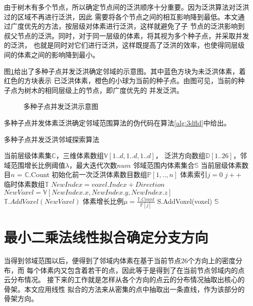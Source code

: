 由于树木有多个节点，所以确定节点间的泛洪顺序十分重要。因为泛洪算法对泛洪过的区域不再进行泛洪，因此
需要将各个节点之间的相互影响降到最低。本文通过广度优先的方法，按层级对体素进行泛洪，这样就避免了子
节点的泛洪影响到叔父节点的泛洪。同时，对于同一层级的体素，将其视为多个种子点，并采取并发的泛洪，
也就是同时对它们进行泛洪，这样既提高了泛洪的效率，也使得同层级间的体素之间的影响降到最小。

图\ref{fig:flood}给出了多种子点并发泛洪确定邻域的示意图。其中蓝色方块为未泛洪体素，着红色的方块表示
已泛洪体素，橙色的小球为当前的种子点。由图可见，当前的种子点为树木的相同层级上的节点，即广度优先的
并发泛洪。

\begin{figure}[H]
	\centering
	\hfill
	\hfill
	\hfill
	\hfill
	\caption{多种子点并发泛洪示意图}
	\label{fig:flood}
\end{figure}

多种子点并发体素泛洪确定邻域范围算法的伪代码在算法\ref{alg:3dfld}中给出。
\begin{algorithm}[H] 
	\caption{多种子点并发泛洪邻域探索算法}
	\label{alg:3dfld}
	\begin{algorithmic}[1]
		\Require 当前层级体素集$\mathbb{C}$，三维体素数组$\mathbb{V}[1..d,1..d,1..d]$，
		泛洪方向数组$\mathbb{D}[1..26]$，邻域范围增长比例阈值$\lambda$，最大迭代次数$num$
		\Ensure	邻域范围内体素集合$\mathbb{S}$
		\State 当前层级体素数目$n$ = $\mathbb{C}$.Count
		\State 初始化前一次泛洪体素数目数组$\mathbb{P}[1,..,n]$
		\State 体素索引$j = 0$
		\State $j++$
		\State 临时体素数组$\mathbb{T}$
			\State $NewIndex = voxel.Index + Direction$
			\State $NewVoxel = \mathbb{V}[NewIndex.x,NewIndex.y,NewIndex.z]$
				\State $\mathbb{T}.AddVoxel(NewVoxel)$
			\EndIf
		\EndFor
		\State 体素增长比例$\mu=\frac{\mathbb{T}.Count}{\mathbb{P}[j]}$
		\If{$\mu > \lambda$}
				\State S.AddVoxel(voxel)
			\EndFor
		\EndIf
		\EndFor
		\EndFor
		\State \Return $\mathbb{S}$
	\end{algorithmic}
\end{algorithm}

\section{最小二乘法线性拟合确定分支方向}
\label{subsec:leastsquares}
当得到邻域范围以后，便得到了邻域内体素在基于当前节点26个方向上的密度分布，而
每个体素内又包含着若干的点，因此等于是得到了在当前节点邻域内的点云分布情况。
接下来的工作就是怎样从各个方向的点云的分布情况抽取出核心的骨架。本文应用线性
拟合的方法来从密集的点中抽取出一条直线，作为该部分的骨架方向。

